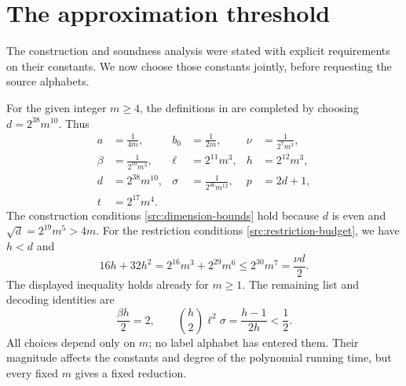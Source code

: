 \section{The approximation threshold}
\label{sec:conclusion}

The construction and soundness analysis were stated with explicit
requirements on their constants. We now choose those constants jointly,
before requesting the source alphabets.

For the given integer \(m\geq4\), the definitions in
are completed by choosing \(d=2^{38}m^{10}\). Thus
\begin{equation}
\begin{aligned}
 a&=\frac1{4m},& b_0&=\frac1{2m},
 &\nu&=\frac1{2^7m^3},\\
 \beta&=\frac1{2^{10}m^3},&\ell&=2^{11}m^3,
 &h&=2^{12}m^3,\\
 d&=2^{38}m^{10},&\sigma&=\frac1{2^{46}m^{12}},
 &p&=2d+1,\\
 t&=2^{17}m^4.
\end{aligned}
\label{src:parameters}
\end{equation}
The construction conditions \eqref{src:dimension-bounds} hold because
\(d\) is even and \(\sqrt d=2^{19}m^5>4m\). For the restriction
conditions \eqref{src:restriction-budget}, we have \(h<d\) and
\[
 16h+32h^2=2^{16}m^3+2^{29}m^6
 \leq2^{30}m^7=\frac{\nu d}{2}.
\]
The displayed inequality holds already for \(m\geq1\).
The remaining list and decoding identities are
\[
 \frac{\beta h}{2}=2,\qquad
 \binom h2\ell^2\sigma=\frac{h-1}{2h}<\frac12.
\]
All choices depend only on \(m\); no label alphabet has entered them.
Their magnitude affects the constants and degree of the polynomial
running time, but every fixed \(m\) gives a fixed reduction.

